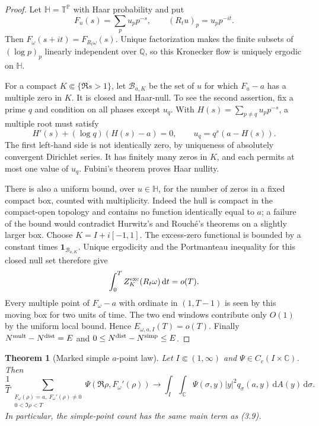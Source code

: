 \documentclass[11pt]{article}
\newtheorem{theorem}{Theorem}[section]
\theoremstyle{definition}
\theoremstyle{remark}
\newcommand{\PP}{\mathbb P}
\newcommand{\dd}{\,\mathrm d}
\newcommand{\C}{\mathbb C}
\newcommand{\one}{\mathbf 1}
\begin{document}
\begin{proof}
Let $\mathbb H=\mathbb T^{\PP}$ with Haar probability and put
\[
 F_u(s)=\sum_pu_pp^{-s},\qquad (R_tu)_p=u_pp^{-it}.
\]
Then $F_\omega(s+it)=F_{R_t\omega}(s)$.  Unique factorization makes the finite
subsets of $(\log p)_p$ linearly independent over $\mathbb Q$, so this Kronecker flow
is uniquely ergodic on $\mathbb H$.

For a compact $K\Subset\{\Re s>1\}$, let $\mathcal B_{a,K}$ be the set of $u$ for
which $F_u-a$ has a multiple zero in $K$.  It is closed and Haar-null.  To see the
second assertion, fix a prime $q$ and condition on all phases except $u_q$.  With
$H(s)=\sum_{p\ne q}u_pp^{-s}$, a multiple root must satisfy
\[
 H'(s)+(\log q)(H(s)-a)=0,
 \qquad u_q=q^s(a-H(s)).
\]
The first left-hand side is not identically zero, by uniqueness of absolutely
convergent Dirichlet series.  It has finitely many zeros in $K$, and each permits at
most one value of $u_q$.  Fubini's theorem proves Haar nullity.

There is also a uniform bound, over $u\in\mathbb H$, for the number of zeros in a
fixed compact box, counted with multiplicity.  Indeed the hull is compact in the
compact-open topology and contains no function identically equal to $a$; a failure of
the bound would contradict Hurwitz's and Rouch\'e's theorems on a slightly larger box.
Choose $K=I+i[-1,1]$.  The excess-zero functional is bounded by a constant times
$\one_{\mathcal B_{a,K}}$.  Unique ergodicity and the Portmanteau inequality for this
closed null set therefore give
\[
 \int_0^T Z_K^{\rm exc}(R_t\omega)\dd t=o(T).
\]
Every multiple point of $F_\omega-a$ with ordinate in $(1,T-1)$ is seen by this
moving box for two units of time.  The two end windows contribute only $O(1)$ by the
uniform local bound.  Hence $E_{\omega,a,I}(T)=o(T)$.  Finally
$N^{\rm mult}-N^{\rm dist}=E$ and
$0\le N^{\rm dist}-N^{\rm simp}\le E$.
\end{proof}

\begin{theorem}[Marked simple $a$-point law]
\label{thm:marked-kac-rice}
Let $I\Subset(1,\infty)$ and $\Psi\in C_c(I\times\C)$.  Then
\[
 \boxed{
 \frac1T\!\sum_{\substack{F_\omega(\rho)=a,\ F_\omega'(\rho)\ne0\\
                              0<\Im\rho<T}}
 \Psi(\Re\rho,F_\omega'(\rho))
 \longrightarrow
 \int_I\!\int_\C \Psi(\sigma,y)|y|^2q_\sigma(a,y)\dd A(y)\dd\sigma .
 }
\]
In particular, the simple-point count has the same main term as (3.9).
\end{theorem}
\end{document}
